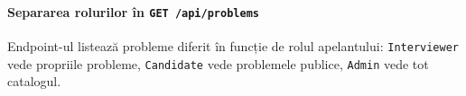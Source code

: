\paragraph{Separarea rolurilor în \texttt{GET /api/problems}}
Endpoint-ul listează probleme diferit în funcție de rolul apelantului:
\texttt{Interviewer} vede propriile probleme, \texttt{Candidate} vede
problemele publice, \texttt{Admin} vede tot catalogul.
